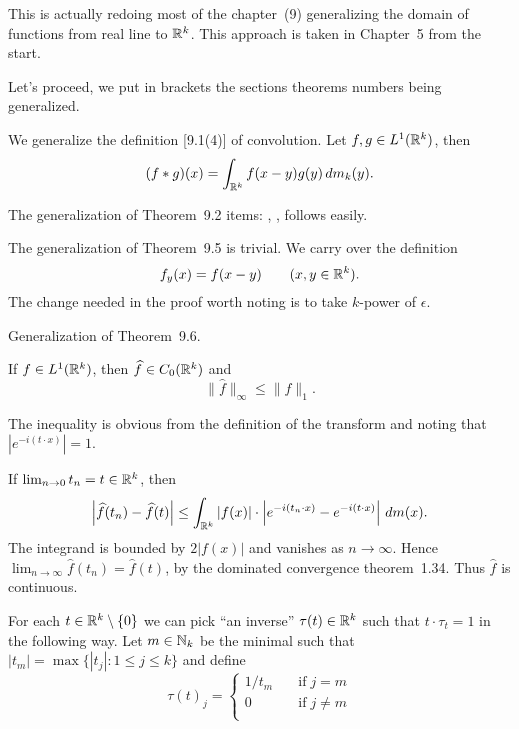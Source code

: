 \begin{enumerate}
This is actually redoing most of the chapter~(9) generalizing 
the domain of functions from real line to \(\mathbb{R}^k\).
This approach is taken in \cite{LiebLoss200104} Chapter~5 from the start.

Let's proceed, we put in brackets the sections theorems numbers
being generalized.

We generalize the definition [9.1(4)] of 
convolution.
Let \(f,g\in L^1(\mathbb{R}^k)\), then
\begin{equation*}
(f \ast g)(x) = \int_{\mathbb{R}^k} f(x-y)g(y)\,dm_k(y).
\end{equation*}

The generalization of Theorem~9.2 items: 
,
,
follows easily.

The generalization of Theorem~9.5 is trivial.
We carry over the definition
\begin{equation*}
f_y(x) = f(x-y) \qquad (x,y\in \mathbb{R}^k).
\end{equation*}
The change needed in the proof worth noting is to take 
$k$-power of \(\epsilon\).

Generalization of Theorem~9.6.
\begin{llem} \label{lem:9.6:kdim}
If \(f\in L^1(\mathbb{R}^k)\), then \(\widehat{f}\in C_0(\mathbb{R}^k)\) and 
\begin{equation*}
\|\widehat{f}\|_\infty \leq \|f\|_1.
\end{equation*}
\end{llem}
\begin{thmproof}
The inequality is obvious from the definition of the transform
and noting that \(|e^{-i(t\cdot x)}|=1\).

If \(\lim_{n\to 0}t_n=t \in \mathbb{R}^k\), then
\begin{equation*}
\left|\widehat{f}(t_n) - \widehat{f}(t)\right|
\leq \int_{\mathbb{R}^k} 
     |f(x)|\cdot\left|e^{-i(t_n\cdot x)} - e^{-i(t\cdot x)}\right|\,dm(x).
\end{equation*}
The integrand is bounded by \(2|f(x)|\) and vanishes as \(n\to\infty\).
Hence \(\lim_{n\to\infty} \widehat{f}(t_n)=\widehat{f}(t)\), 
by the dominated convergence theorem~1.34. Thus \(\widehat{f}\) 
is continuous.

For each \(t\in\mathbb{R}^k\setminus\{0\}\) we can pick ``an inverse''
\(\tau(t)\in\mathbb{R}^k\) such that \(t\cdot\tau_t = 1\) in the following way.
Let \(m\in \mathbb{N}_k\) be the minimal such that
\(|t_m|=\max\{|t_j|: 1\leq j \leq k\}\)
and define
\begin{equation*}
\tau(t)_j = \left\{%
\begin{array}{ll}
1/t_m \quad& \textrm{if}\; j=m \\
0          & \textrm{if}\; j\neq m \\
\end{array}\right.
\end{equation*}


\end{thmproof}
\end{enumerate}
